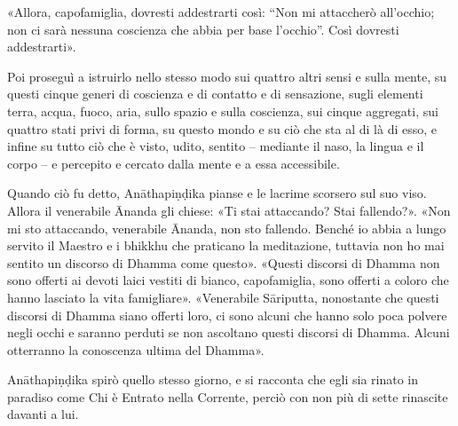  «Allora, capofamiglia, dovresti addestrarti così: “Non mi
attaccherò all’occhio; non ci sarà nessuna coscienza che abbia per base
l’occhio”. Così dovresti addestrarti».


 Poi proseguì a istruirlo nello stesso modo sui
quattro altri sensi e sulla mente, su questi cinque generi di coscienza
e di contatto e di sensazione, sugli elementi terra, acqua, fuoco, aria,
sullo spazio e sulla coscienza, sui cinque aggregati, sui quattro stati
privi di forma, su questo mondo e su ciò che sta al di là di esso, e
infine su tutto ciò che è visto, udito, sentito – mediante il naso, la
lingua e il corpo – e percepito e cercato dalla mente e a essa
accessibile.


 Quando ciò fu detto, Anāthapiṇḍika pianse e le lacrime
scorsero sul suo viso. Allora il venerabile Ānanda gli chiese: «Ti stai
attaccando? Stai fallendo?». «Non mi sto attaccando, venerabile Ānanda,
non sto fallendo. Benché io abbia a lungo servito il Maestro e i bhikkhu
che praticano la meditazione, tuttavia non ho mai sentito un discorso di
Dhamma come questo». «Questi discorsi di Dhamma non sono offerti ai
devoti laici vestiti di bianco, capofamiglia, sono offerti a coloro che
hanno lasciato la vita famigliare». «Venerabile Sāriputta, nonostante
che questi discorsi di Dhamma siano offerti loro, ci sono alcuni che
hanno solo poca polvere negli occhi e saranno perduti se non ascoltano
questi discorsi di Dhamma. Alcuni otterranno la conoscenza ultima del
Dhamma».




 Anāthapiṇḍika spirò quello stesso giorno, e si
racconta che egli sia rinato in paradiso come Chi è Entrato nella
Corrente, perciò con non più di sette rinascite davanti a lui.



